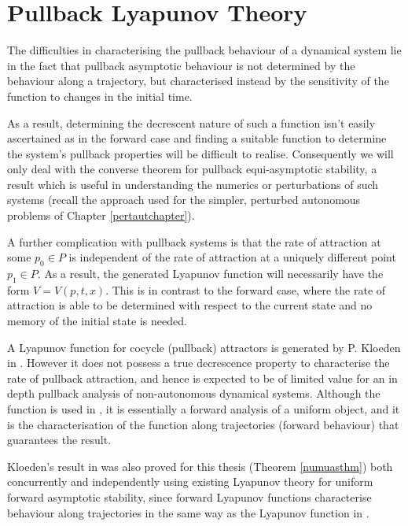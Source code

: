 \section{Pullback Lyapunov Theory}
\label{PLiapsec}

The difficulties in characterising the pullback behaviour of a dynamical system
lie in the fact that pullback asymptotic behaviour is not determined by the
behaviour along a trajectory, but characterised instead by the sensitivity of
the function to changes in the initial time.

As a result, determining the decrescent nature of such a function isn't easily
ascertained as in the forward case and finding a suitable function to determine
the system's pullback properties will be difficult to realise. Consequently we
will only deal with the converse theorem for pullback equi-asymptotic stability,
a result which is useful in understanding the numerics or perturbations of
such systems (recall the approach used for the simpler, perturbed autonomous
problems of Chapter \ref{pertautchapter}).

A further complication with pullback systems is that the rate of
attraction at some $p_0 \in P$ is independent of the rate of
attraction at a uniquely different point $p_1 \in P$. As a result,
the generated Lyapunov function will necessarily have the form
$V=V(p, t, x)$. This is in contrast to the forward case, where
the rate of attraction is able to be determined with respect to the current
state and no memory of the initial state is needed.

A Lyapunov function for cocycle (pullback) attractors is generated by P.
Kloeden in \cite{Kl98}. However it does not possess a true decrescence
property to characterise the rate of pullback attraction, and hence is expected
to be of limited value for an in depth pullback analysis of non-autonomous
dynamical systems. Although the function is used in \cite{KlKo01}, it is
essentially a forward analysis of a uniform object, and it is the
characterisation of the function along trajectories (forward behaviour) that
guarantees the result.

Kloeden's result in \cite{KlKo01} was also proved for this thesis
(Theorem \ref{numuasthm}) both concurrently and independently
using existing Lyapunov theory for uniform forward asymptotic
stability, since forward Lyapunov functions characterise behaviour
along trajectories in the same way as the Lyapunov function in
\cite{Kl98}.

